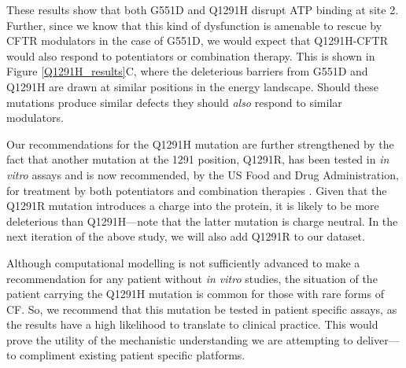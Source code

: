 These results show that both G551D and Q1291H disrupt ATP binding at site 2. Further, since we know that this kind of dysfunction is amenable to rescue by CFTR modulators in the case of G551D, we would expect that Q1291H-CFTR would also respond to potentiators or combination therapy. This is shown in Figure \ref{Q1291H_results}C, where the deleterious barriers from G551D and Q1291H are drawn at similar positions in the energy landscape. Should these mutations produce similar defects they should \textit{also} respond to similar modulators.

Our recommendations for the Q1291H mutation are further strengthened by the fact that another mutation at the 1291 position, Q1291R, has been tested in \textit{in vitro} assays and is now recommended, by the US Food and Drug Administration, for treatment by both potentiators and combination therapies \cite{trikafta_website, trikafta_FDA_info, kalydeco_FDA_approval}. Given that the Q1291R mutation introduces a charge into the protein, it is likely to be more deleterious than Q1291H---note that the latter mutation is charge neutral. In the next iteration of the above study, we will also add Q1291R to our dataset. 

Although computational modelling is not sufficiently advanced to make a recommendation for any patient without \textit{in vitro} studies, the situation of the patient carrying the Q1291H mutation is common for those with rare forms of CF. So, we recommend that this mutation be tested in patient specific assays, as the results have a high likelihood to translate to clinical practice. This would prove the utility of the mechanistic understanding we are attempting to deliver---to compliment existing patient specific platforms.



